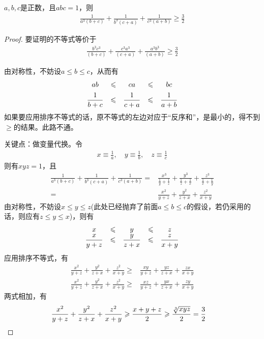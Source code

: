 \begin{example}[IMO 1995]
  $a,b,c$是正数，且$abc=1$，则
  \begin{align*}
    \frac1{a^3(b+c)} + \frac1{b^3(c+a)} + \frac1{c^3(a+b)}\ge\frac32
  \end{align*}
\end{example}
\begin{proof}
  要证明的不等式等价于
  \begin{align*}
    \frac{b^3c^3}{(b+c)} + \frac{c^3a^3}{(c+a)} + \frac{a^3b^3}{(a+b)}\ge\frac32
  \end{align*}

  由对称性，不妨设$a\le b\le c$，从而有
  \begin{align*}
    \begin{array}{*5{>{\displaystyle}c}}
      ab & \le & ca & \le & bc  \\[5pt]
      \frac1{b+c} & \le & \frac1{c+a} & \le & \frac1{a+b}
    \end{array}
  \end{align*}
  如果要应用排序不等式的话，原不等式的左边对应于“反序和”，是最小的，得不到$\ge$的结果。此路不通。

  关键点：做变量代换。令
  \begin{align*}
    x\equiv\frac1a,\quad y\equiv\frac1b,\quad z\equiv\frac1c
  \end{align*}
  则有$xyz=1$，且
  \begin{align*}
    \frac1{a^3(b+c)} + \frac1{b^3(c+a)} + \frac1{c^3(a+b)} =&
    \frac{x^3}{\frac1y+\frac1z} + \frac{y^3}{\frac1z+\frac1x} + \frac{z^3}{\frac1x+\frac1y}\\
    =&\frac{x^2}{y+z}+\frac{y^2}{z+x}+\frac{z^2}{x+y}
  \end{align*}
  由对称性，不妨设$x\le y\le z$(此处已经抛弃了前面$a\le b\le c$的假设，若仍采用的话，则应有$z\le y\le x$)，则有
  \begin{align*}
    \begin{array}{*5{>{\displaystyle}c}}
      x & \le & y & \le & z\\
      \frac{x}{y+z} & \le & \frac{y}{z+x} & \le & \frac{z}{x+y}
    \end{array}
  \end{align*}
  应用排序不等式，有
  \begin{align*}
    \frac{x^2}{y+z}+\frac{y^2}{z+x}+\frac{z^2}{x+y} \ge & \frac{xy}{y+z}+\frac{yz}{z+x}+\frac{zx}{x+y}\\
    \frac{x^2}{y+z}+\frac{y^2}{z+x}+\frac{z^2}{x+y} \ge & \frac{xz}{y+z}+\frac{yx}{z+x}+\frac{zy}{x+y}
  \end{align*}
  两式相加，有
  \begin{align*}
    \frac{x^2}{y+z}+\frac{y^2}{z+x}+\frac{z^2}{x+y} \ge \frac{x+y+z}{2}\ge\frac{\sqrt[3]{xyz}}{2}=\frac32&\qedhere
  \end{align*}
\end{proof}

